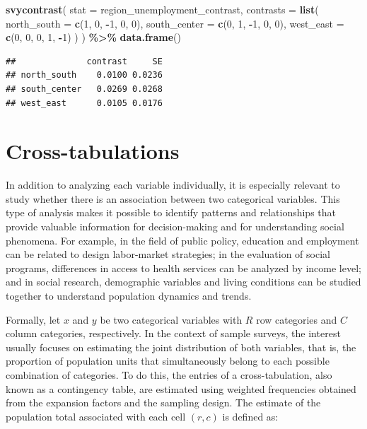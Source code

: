 \documentclass[
  english,
  12pt,
]{book}
\newenvironment{Shaded}{\begin{snugshade}}{\end{snugshade}}
\newcommand{\AttributeTok}[1]{\textcolor[rgb]{0.13,0.29,0.53}{#1}}
\newcommand{\DecValTok}[1]{\textcolor[rgb]{0.00,0.00,0.81}{#1}}
\newcommand{\FunctionTok}[1]{\textcolor[rgb]{0.13,0.29,0.53}{\textbf{#1}}}
\newcommand{\NormalTok}[1]{#1}
\newcommand{\SpecialCharTok}[1]{\textcolor[rgb]{0.81,0.36,0.00}{\textbf{#1}}}
\begin{document}
\begin{Shaded}
\begin{Highlighting}[]
\FunctionTok{svycontrast}\NormalTok{(}
  \AttributeTok{stat =}\NormalTok{ region\_unemployment\_contrast,}
  \AttributeTok{contrasts =} \FunctionTok{list}\NormalTok{(}
    \AttributeTok{north\_south =} \FunctionTok{c}\NormalTok{(}\DecValTok{1}\NormalTok{, }\DecValTok{0}\NormalTok{, }\SpecialCharTok{{-}}\DecValTok{1}\NormalTok{, }\DecValTok{0}\NormalTok{, }\DecValTok{0}\NormalTok{),}
    \AttributeTok{south\_center =} \FunctionTok{c}\NormalTok{(}\DecValTok{0}\NormalTok{, }\DecValTok{1}\NormalTok{, }\SpecialCharTok{{-}}\DecValTok{1}\NormalTok{, }\DecValTok{0}\NormalTok{, }\DecValTok{0}\NormalTok{),}
    \AttributeTok{west\_east =} \FunctionTok{c}\NormalTok{(}\DecValTok{0}\NormalTok{, }\DecValTok{0}\NormalTok{, }\DecValTok{0}\NormalTok{, }\DecValTok{1}\NormalTok{, }\SpecialCharTok{{-}}\DecValTok{1}\NormalTok{)}
\NormalTok{  )}
\NormalTok{) }\SpecialCharTok{\%\textgreater{}\%}
  \FunctionTok{data.frame}\NormalTok{()}
\end{Highlighting}
\end{Shaded}

\begin{verbatim}
##              contrast     SE
## north_south    0.0100 0.0236
## south_center   0.0269 0.0268
## west_east      0.0105 0.0176
\end{verbatim}

\section{Cross-tabulations}\label{tablas-cruzadas}

In addition to analyzing each variable individually, it is especially relevant to study whether there is an association between two categorical variables. This type of analysis makes it possible to identify patterns and relationships that provide valuable information for decision-making and for understanding social phenomena. For example, in the field of public policy, education and employment can be related to design labor-market strategies; in the evaluation of social programs, differences in access to health services can be analyzed by income level; and in social research, demographic variables and living conditions can be studied together to understand population dynamics and trends.

Formally, let \(x\) and \(y\) be two categorical variables with \(R\) row categories and \(C\) column categories, respectively. In the context of sample surveys, the interest usually focuses on estimating the joint distribution of both variables, that is, the proportion of population units that simultaneously belong to each possible combination of categories. To do this, the entries of a cross-tabulation, also known as a contingency table, are estimated using weighted frequencies obtained from the expansion factors and the sampling design. The estimate of the population total associated with each cell \((r,c)\) is defined as:
\end{document}
